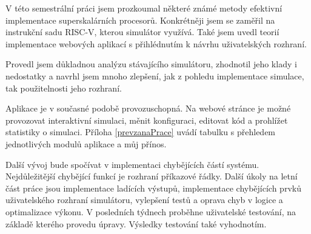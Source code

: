 V této semestrální práci jsem prozkoumal některé známé metody efektivní implementace superskalárních procesorů.
Konkrétněji jsem se zaměřil na instrukční sadu RISC-V, kterou simulátor využívá.
Také jsem uvedl teorií implementace webových aplikací s přihlédnutím k návrhu uživatelských rozhraní.

Provedl jsem důkladnou analýzu stávajícího simulátoru, zhodnotil jeho klady i nedostatky a navrhl jsem mnoho zlepšení, jak z pohledu implementace simulace, tak použitelnosti jeho rozhraní.

Aplikace je v současné podobě provozuschopná.
Na webové stránce je možné provozovat interaktivní simulaci, měnit konfiguraci, editovat kód a prohlížet statistiky o simulaci.
Příloha \ref{prevzanaPrace} uvádí tabulku s přehledem jednotlivých modulů aplikace a můj přínos.

Další vývoj bude spočívat v implementaci chybějících částí systému.
Nejdůležitější chybějící funkcí je rozhraní příkazové řádky.
Další úkoly na letní část práce jsou implementace ladících výstupů, implementace chybějících prvků uživatelského rozhraní simulátoru, vylepšení testů a oprava chyb v logice a optimalizace výkonu.
V posledních týdnech proběhne uživatelské testování, na základě kterého provedu úpravy.
Výsledky testování také vyhodnotím.
